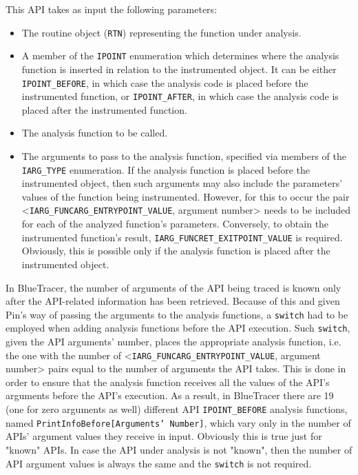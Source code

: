This API takes as input the following parameters:
\begin{itemize}
\item The routine object (\texttt{RTN}) representing the function under analysis.
\item A member of the \texttt{IPOINT} enumeration which determines where the analysis function is inserted in relation to the instrumented object. It can be either \texttt{IPOINT\_BEFORE}, in which case the analysis code is placed before the instrumented function, or \texttt{IPOINT\_AFTER}, in which case the analysis code is placed after the instrumented function.
\item The analysis function to be called.
\item The arguments to pass to the analysis function, specified via members of the \texttt{IARG\_TYPE} enumeration. If the analysis function is placed before the instrumented object, then such arguments may also include the parameters' values of the function being instrumented. However, for this to occur the pair <\texttt{IARG\_FUNCARG\_ENTRYPOINT\_VALUE}, argument number> needs to be included for each of the analyzed function's parameters. Conversely, to obtain the instrumented function's result, \texttt{IARG\_FUNCRET\_EXITPOINT\_VALUE} is required. Obviously, this is possible only if the analysis function is placed after the instrumented object.
\end{itemize}

In BlueTracer, the number of arguments of the API being traced is known only after the API-related information has been retrieved. Because of this and given Pin's way of passing the arguments to the analysis functions, a \texttt{switch} had to be employed when adding analysis functions before the API execution. Such \texttt{switch}, given the API arguments' number, places the appropriate analysis function, i.e. the one with the number of <\texttt{IARG\_FUNCARG\_ENTRYPOINT\_VALUE}, argument number> pairs equal to the number of arguments the API takes. This is done in order to ensure that the analysis function receives all the values of the API's arguments before the API's execution. As a result, in BlueTracer there are 19 (one for zero arguments as well) different API \texttt{IPOINT\_BEFORE} analysis functions, named \texttt{PrintInfoBefore[Arguments' Number]}, which vary only in the number of APIs' argument values they receive in input. Obviously this is true just for "known" APIs. In case the API under analysis is not "known", then the number of API argument values is always the same and the \texttt{switch} is not required.

